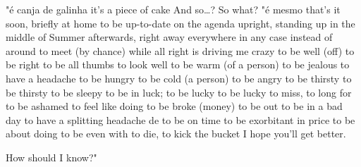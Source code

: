 {{{{  "é canja de galinha}
{it’s a piece of cake}
{And so…?}
{So what?}
  "é mesmo}
{that’s it}
{soon, briefly}
{at home}
{to be up-to-date}
{on the agenda}
{upright, standing up}
{in the middle of Summer}
{afterwards, right away}
{everywhere}
{in any case}
{instead of}
{around}
{to meet (by chance)}
{while}
{all right}
{is driving me crazy}
{to be well (off)}
{to be right}
{to be all thumbs}
{to look well}
{to be warm (of a person)}
{to be jealous}
{to have a headache}
{to be hungry}
{to be cold (a person)}
{to be angry}
{to be thirsty}
{to be thirsty}
{to be sleepy}
{to be in luck; to be lucky}
{to be lucky}
{to miss, to long for}
{to be ashamed}
{to feel like doing}
{to be broke (money)}
{to be out}
{to be in a bad day}
{to have a splitting headache}
{de to be on time}
{to be exorbitant in price}
{to be about doing}
{to be even with}
{to die, to kick the bucket}
{I hope you’ll get better.}
{How should I know?"

}}}
